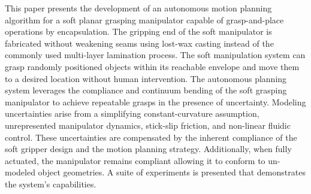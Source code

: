This paper presents the development of an autonomous motion planning algorithm for a soft planar grasping manipulator capable of grasp-and-place operations by encapsulation.
The gripping end of the soft manipulator is fabricated without weakening seams using lost-wax casting instead of the commonly used multi-layer lamination process.
The soft manipulation system can grasp randomly positioned objects within its reachable envelope and move them to a desired location without human intervention.
The autonomous planning system leverages the compliance and continuum bending of the soft grasping manipulator to achieve repeatable grasps in the presence of uncertainty.
Modeling uncertainties arise from a simplifying constant-curvature assumption, unrepresented manipulator dynamics, stick-slip friction, and  non-linear fluidic control. 
These uncertainties are compensated by the inherent compliance of the soft gripper design and the motion planning strategy.
Additionally, when fully actuated, the manipulator remains compliant allowing it to conform to un-modeled object geometries.
A suite of experiments is presented that demonstrates the system's capabilities.